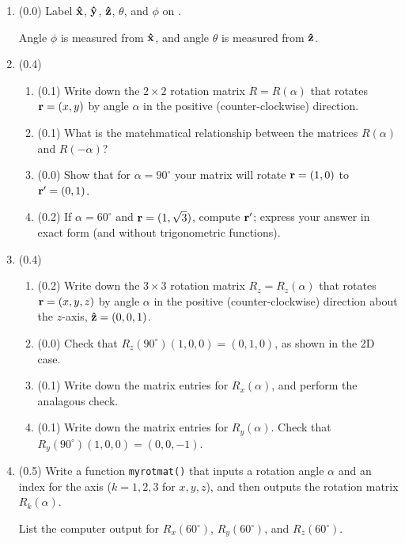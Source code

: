\documentclass[11pt,titlepage,fleqn]{article}
\newcommand{\rotangA}{\alpha}
\newcommand{\Rmat}{R}
\begin{document}
\begin{enumerate}

\item (0.0) Label $\mbox{\boldmath{$\hat{\rm x}$}}$, $\mbox{\boldmath{$\hat{\rm y}$}}$, $\mbox{\boldmath{$\hat{\rm z}$}}$, $\theta$, and $\phi$ on .

Angle $\phi$ is measured from $\mbox{\boldmath{$\hat{\rm x}$}}$, and angle $\theta$ is measured from $\mbox{\boldmath{$\hat{\rm z}$}}$.

\item (0.4) 

\begin{enumerate}
\item (0.1) Write down the $2 \times 2$ rotation matrix $\Rmat = \Rmat(\rotangA)$ that rotates $\mbox{${\bf r}$} = (x,y)$ by angle $\rotangA$ in the positive (counter-clockwise) direction.
\item (0.1) What is the matehmatical relationship between the matrices $\Rmat(\rotangA)$ and $\Rmat(-\rotangA)$?
\item (0.0) Show that for $\rotangA = 90^\circ$ your matrix will rotate $\mbox{${\bf r}$} = (1,0)$ to $\mbox{${\bf r}$}' = (0,1)$.
\item (0.2) If $\rotangA = 60^\circ$ and $\mbox{${\bf r}$} = (1,\sqrt{3})$, compute $\mbox{${\bf r}$}'$; express your answer in exact form (and without trigonometric functions).
\end{enumerate}

\item (0.4)

\begin{enumerate}
\item (0.2) Write down the $3 \times 3$ rotation matrix $\Rmat_z = \Rmat_z(\rotangA)$ that rotates $\mbox{${\bf r}$} = (x,y,z)$ by angle $\rotangA$ in the positive (counter-clockwise) direction about the $z$-axis, $\mbox{\boldmath{$\hat{\rm z}$}} = (0,0,1)$.
\item (0.0) Check that $\Rmat_z(90^\circ)(1,0,0) = (0,1,0)$, as shown in the 2D case.
\item (0.1) Write down the matrix entries for $\Rmat_x(\rotangA)$, and perform the analagous check.
\item (0.1) Write down the matrix entries for $\Rmat_y(\rotangA)$. Check that $\Rmat_y(90^\circ)(1,0,0) = (0,0,-1)$.
\end{enumerate}

\item (0.5) Write a function \verb+myrotmat()+ that inputs a rotation angle $\rotangA$ and an index for the axis ($k = 1,2,3$ for $x,y,z$), and then outputs the rotation matrix $\Rmat_k(\rotangA)$. 

List the computer output for $\Rmat_x(60^\circ)$, $\Rmat_y(60^\circ)$, and $\Rmat_z(60^\circ)$.


\end{enumerate}
\end{document}
